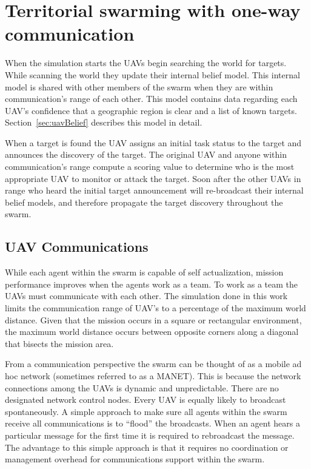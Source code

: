 \chapter{Territorial swarming with one-way communication}
\label{chap:myModel}
When the simulation starts the UAVs begin searching the world for targets.  While scanning the world they update their internal belief model.  This internal model is shared with other members of the swarm when they are within communication's range of each other.  This model contains data regarding each UAV's confidence that a geographic region is clear and a list of known targets.  Section~\ref{sec:uavBelief} describes this model in detail.

When a target is found the UAV assigns an initial task status to the target and announces the discovery of the target.  The original UAV and anyone within communication's range compute a scoring value to determine who is the most appropriate UAV to monitor or attack the target.  Soon after the other UAVs in range who heard the initial target announcement will re-broadcast their internal belief models, and therefore propagate the target discovery throughout the swarm.

\section{UAV Communications}
While each agent within the swarm is capable of self actualization, mission performance improves when the agents work as a team.  To work as a team the UAVs must communicate with each other.  The simulation done in this work limits the communication range of UAV's to a percentage of the maximum world distance.  Given that the mission occurs in a square or rectangular environment, the maximum world distance occurs between opposite corners along a diagonal that bisects the mission area.  %

From a communication perspective the swarm can be thought of as a mobile ad hoc network (sometimes referred to as a MANET).  This is because the network connections among the UAVs is dynamic and unpredictable.  There are no designated network control nodes.  Every UAV is equally likely to broadcast spontaneously.  A simple approach to make sure all agents within the swarm receive all communications is to ``flood'' the broadcasts.  When an agent hears a particular message for the first time it is required to rebroadcast the message.  The advantage to this simple approach is that it requires no coordination or management overhead for communications support within the swarm.

